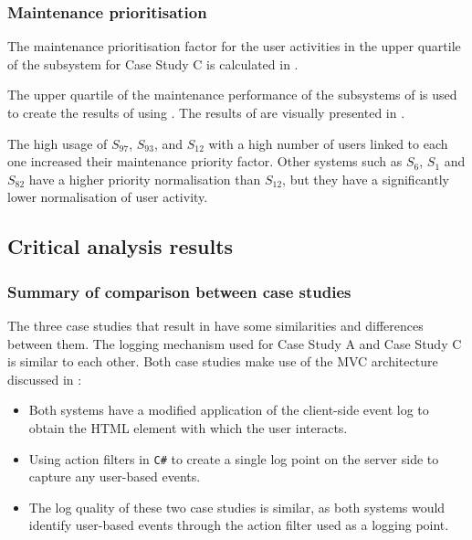 \subsubsection{Maintenance prioritisation}
The maintenance prioritisation factor for the user activities in the upper quartile of the subsystem for Case Study C is calculated in .



The upper quartile of the maintenance performance of the subsystems of  is used to create the results of  using . The results of  are visually presented in .\par The high usage of $S_{97}$, $S_{93}$, and $S_{12}$ with a high number of users linked to each one increased their maintenance priority factor. Other systems such as $S_{6}$, $S_{1}$ and $S_{82}$ have a higher priority normalisation than $S_{12}$, but they have a significantly lower normalisation of user activity.

\subsection{Critical analysis results}\label{sec:ch3_criticalAnalysis}

\subsubsection{Summary of comparison between case studies}
The three case studies that result in  have some similarities and differences between them. The logging mechanism used for Case Study A and Case Study C is similar to each other. Both case studies make use of the MVC architecture discussed in :

\begin{itemize}
	\item Both systems have a modified application of the  client-side event log to obtain the HTML element with which the user interacts.
	\item Using action filters in \texttt{C\#} to create a single log point on the server side to capture any user-based events. 
	\item The log quality of these two case studies is similar, as both systems would identify user-based events through the action filter used as a logging point.
\end{itemize}

